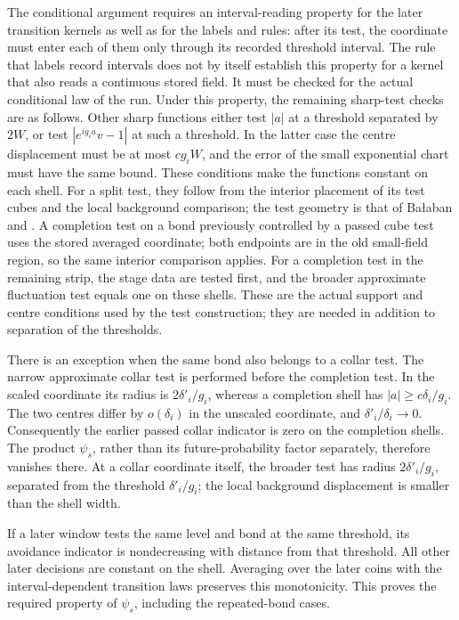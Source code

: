 \documentclass[11pt,letterpaper,reqno]{amsart}
\theoremstyle{definition}
\theoremstyle{remark}
\begin{document}
The conditional argument requires an interval-reading property
for the later transition kernels as well as for the labels and
rules: after its test, the coordinate must enter each of them
only through its recorded threshold interval. The rule that
labels record intervals does not by itself establish this
property for a kernel that also reads a continuous stored field.
It must be checked for the actual conditional law of the run.
Under this property, the remaining sharp-test checks are as follows. Other sharp
functions either test $|a|$ at a threshold separated by $2W$,
or test $|e^{ig_i a}v-1|$ at such a threshold. In the latter
case the centre displacement must be at most $cg_iW$,
and the error of the small exponential chart must have the
same bound. These conditions make the functions constant on
each shell. For a split test, they follow from the interior
placement of its test cubes and the local background comparison;
the test geometry is that of
Ba\l aban\cite[equation~(3.19)]{Balaban1988} and
\cite[equations~(1.56)--(1.58)]{Balaban1989I}.
A completion test on a bond previously controlled by a passed
cube test uses the stored averaged coordinate; both endpoints
are in the old small-field region, so the same interior
comparison applies. For a completion test in the remaining
strip, the stage data are tested first, and the broader
approximate fluctuation test equals one on these shells.
These are the actual support and centre conditions used by
the test construction; they are needed in addition to
separation of the thresholds.

There is an exception when the same bond also belongs to a
collar test. The narrow approximate collar test is performed
before the completion test. In the scaled coordinate its
radius is $2\delta'_i/g_i$, whereas a completion shell has
$|a|\ge c\delta_i/g_i$. The two centres differ by
$o(\delta_i)$ in the unscaled coordinate, and
$\delta'_i/\delta_i\to0$. Consequently the earlier passed
collar indicator is zero on the completion shells. The product
$\psi_s$, rather than its future-probability factor separately,
therefore vanishes there. At a collar coordinate itself, the
broader test has radius $2\delta'_i/g_i$, separated from
the threshold $\delta'_i/g_i$; the local background
displacement is smaller than the shell width.

If a later window tests the same level and bond at the same
threshold, its avoidance indicator is nondecreasing with
distance from that threshold. All other later decisions are
constant on the shell. Averaging over the later coins with
the interval-dependent transition laws preserves this
monotonicity. This proves the required property of
$\psi_s$, including the repeated-bond cases.
\end{document}
